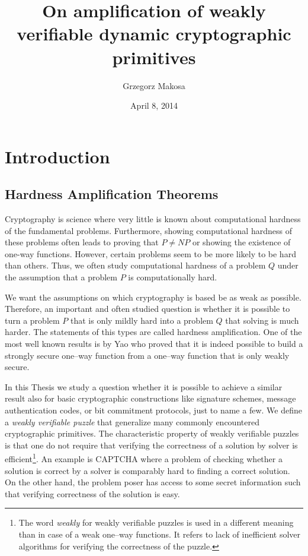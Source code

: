 \documentclass[11pt,a4paper,titlepage]{memoir}
\title{On amplification of weakly verifiable dynamic cryptographic primitives}
\author{Grzegorz Makosa}
\date{April 8, 2014}
\begin{document}
\frontmatter

%

\cleartorecto
\tableofcontents
\mainmatter

\chapter{Introduction}
\section{Hardness Amplification Theorems}
Cryptography is science where very little is known about computational hardness of the fundamental problems.
Furthermore, showing computational hardness of these problems often leads to proving that $P \neq NP$ or showing the existence of one-way functions.
However, certain problems seem to be more likely to be hard than others.
Thus, we often study computational hardness of a problem $Q$ under the assumption that a problem $P$ is computationally hard.

We want the assumptions on which cryptography is based be as weak as possible.
Therefore, an important and often studied question is whether it is possible to turn a problem $P$
that is only mildly hard into a problem $Q$ that solving is much harder.
The statements of this types are called hardness amplification. One of the most well known
results is by Yao who proved that it is indeed possible to build a strongly secure one--way function
from a one--way function that is only weakly secure.

In this Thesis we study a question whether it is possible to achieve a similar result also for basic cryptographic constructions
like signature schemes, message authentication codes, or bit commitment protocols, just to name a few.
We define a \textit{weakly verifiable puzzle} that generalize many commonly encountered cryptographic primitives.
The characteristic property of weakly verifiable puzzles is that one do not require that verifying the correctness of a solution by solver is efficient\footnote{
The word \textit{weakly} for weakly verifiable puzzles is used in a different meaning than in case of a weak one--way functions.
It refers to lack of inefficient solver algorithms for verifying the correctness of the puzzle.}.
An example is CAPTCHA where a problem of checking whether a solution is correct by a solver is comparably hard to finding a correct solution.
On the other hand, the problem poser has access to some secret information such that verifying correctness of the solution is easy.
\end{document}
